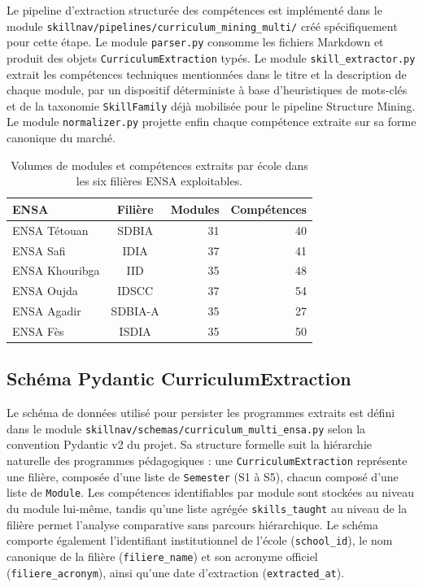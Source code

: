 \documentclass[11pt,a4paper,openany]{report}
\begin{document}
Le pipeline d'extraction structur\'ee des comp\'etences est impl\'ement\'e dans le module \texttt{skillnav/pipelines/curriculum\_mining\_multi/} cr\'e\'e sp\'ecifiquement pour cette \'etape. Le module \texttt{parser.py} consomme les fichiers Markdown et produit des objets \texttt{CurriculumExtraction} typ\'es. Le module \texttt{skill\_extractor.py} extrait les comp\'etences techniques mentionn\'ees dans le titre et la description de chaque module, par un dispositif d\'eterministe \`a base d'heuristiques de mots-cl\'es et de la taxonomie \texttt{SkillFamily} d\'ej\`a mobilis\'ee pour le pipeline Structure Mining. Le module \texttt{normalizer.py} projette enfin chaque comp\'etence extraite sur sa forme canonique du march\'e.

\begin{table}[H]
  \centering
  \caption{Volumes de modules et comp\'etences extraits par \'ecole dans les six fili\`eres ENSA exploitables.}
  \label{tab:volumes-curr}
  \begin{tabular}{lcrr}
    \toprule
    \rowcolor{softblue}\textbf{ENSA} & \textbf{Fili\`ere} & \textbf{Modules} & \textbf{Comp\'etences} \\
    \midrule
    ENSA T\'etouan & SDBIA & 31 & 40 \\
    ENSA Safi & IDIA & 37 & 41 \\
    ENSA Khouribga & IID & 35 & 48 \\
    ENSA Oujda & IDSCC & 37 & 54 \\
    ENSA Agadir & SDBIA-A & 35 & 27 \\
    ENSA F\`es & ISDIA & 35 & 50 \\
    \bottomrule
  \end{tabular}
\end{table}

\subsection{Sch\'ema Pydantic CurriculumExtraction}

Le sch\'ema de donn\'ees utilis\'e pour persister les programmes extraits est d\'efini dans le module \texttt{skillnav/schemas/curriculum\_multi\_ensa.py} selon la convention Pydantic v2 du projet. Sa structure formelle suit la hi\'erarchie naturelle des programmes p\'edagogiques : une \texttt{CurriculumExtraction} repr\'esente une fili\`ere, compos\'ee d'une liste de \texttt{Semester} (S1 \`a S5), chacun compos\'e d'une liste de \texttt{Module}. Les comp\'etences identifiables par module sont stock\'ees au niveau du module lui-m\^eme, tandis qu'une liste agr\'eg\'ee \texttt{skills\_taught} au niveau de la fili\`ere permet l'analyse comparative sans parcours hi\'erarchique. Le sch\'ema comporte \'egalement l'identifiant institutionnel de l'\'ecole (\texttt{school\_id}), le nom canonique de la fili\`ere (\texttt{filiere\_name}) et son acronyme officiel (\texttt{filiere\_acronym}), ainsi qu'une date d'extraction (\texttt{extracted\_at}).
\end{document}
